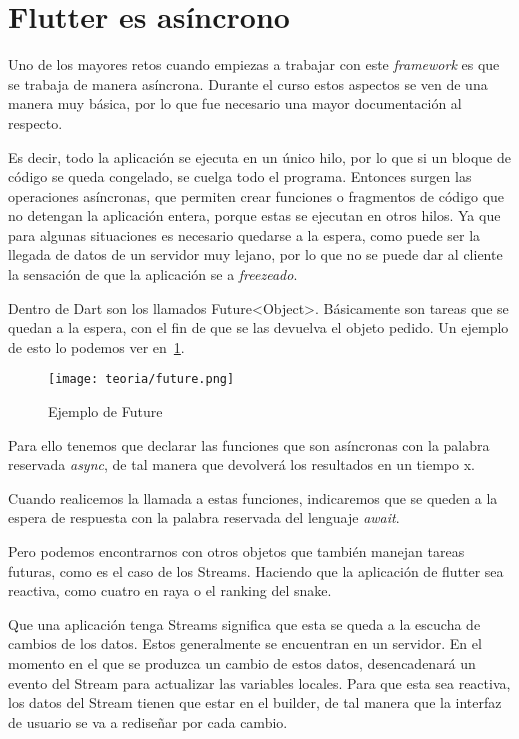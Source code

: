 \section{Flutter es asíncrono}
Uno de los mayores retos cuando empiezas a trabajar con este \emph{framework} es que se trabaja de manera asíncrona. Durante el curso estos aspectos se ven de una manera muy básica, por lo que fue necesario una mayor documentación al respecto.

Es decir, todo la aplicación se ejecuta en un único hilo, por lo que si un bloque de código se queda congelado, se cuelga todo el programa. Entonces surgen las operaciones asíncronas, que permiten crear funciones o fragmentos de código que no detengan la aplicación entera, porque estas se ejecutan en otros hilos. Ya que para algunas situaciones es necesario quedarse a la espera, como puede ser la llegada de datos de un servidor muy lejano, por lo que no se puede dar al cliente la sensación de que la aplicación se a \emph{freezeado}.

Dentro de Dart son los llamados Future<Object>. Básicamente son tareas que se quedan a la espera, con el fin de que se las devuelva el objeto pedido. Un ejemplo de esto lo podemos ver en~\ref{fig:future}.

\begin{figure}[H]
	\centering
	\texttt{[image: teoria/future.png]}
	\caption{Ejemplo de Future}\label{fig:future}
\end{figure}

Para ello tenemos que declarar las funciones que son asíncronas con la palabra reservada \emph{async}, de tal manera que devolverá los resultados en un tiempo x.

Cuando realicemos la llamada a estas funciones, indicaremos que se queden a la espera de respuesta con la palabra reservada del lenguaje \emph{await}.

Pero podemos encontrarnos con otros objetos que también manejan tareas futuras, como es el caso de los Streams. Haciendo que la aplicación de flutter sea reactiva, como cuatro en raya o el ranking del snake.

Que una aplicación tenga Streams significa que esta se queda a la escucha de cambios de los datos. Estos generalmente se encuentran en un servidor. En el momento en el que se produzca un cambio de estos datos, desencadenará un evento del Stream para actualizar las variables locales.
Para que esta sea reactiva, los datos del Stream tienen que estar en el builder, de tal manera que la interfaz de usuario se va a rediseñar por cada cambio.

